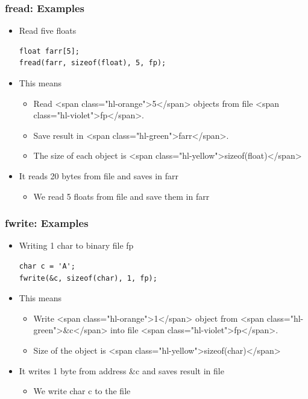 \documentclass{../c-lecture}
\begin{document}
\begin{frame}[fragile]
  \frametitle{fread: Examples}
  \begin{itemize}
    \item Read five floats
    \begin{verbatim}
float farr[5];
fread(farr, sizeof(float), 5, fp);
    \end{verbatim}
    \item This means
    \begin{itemize}
      \item
        Read <span class="hl-orange">5</span> objects from file
        <span class="hl-violet">fp</span>.

      \item Save result in <span class="hl-green">farr</span>.
      \item
        The size of each object is
        <span class="hl-yellow">sizeof(float)</span>

    \end{itemize}
    \item It reads 20 bytes from file and saves in farr
    \begin{itemize}
      \item We read 5 floats from file and save them in farr
    \end{itemize}
  \end{itemize}
\end{frame}

\begin{frame}[fragile]
  \frametitle{fwrite: Examples}
  \begin{itemize}
    \item Writing 1 char to binary file fp
    \begin{verbatim}
char c = 'A';
fwrite(&c, sizeof(char), 1, fp);
    \end{verbatim}
    \item This means
    \begin{itemize}
      \item
        Write <span class="hl-orange">1</span> object from
        <span class="hl-green">\&c</span> into file
        <span class="hl-violet">fp</span>.

      \item Size of the object is <span class="hl-yellow">sizeof(char)</span>
    \end{itemize}
    \item It writes 1 byte from address \&c and saves result in file
    \begin{itemize}
      \item We write char c to the file
    \end{itemize}
  \end{itemize}
\end{frame}
\end{document}
